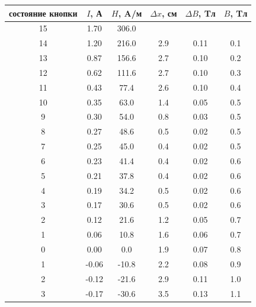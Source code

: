 \documentclass[a4paper,14pt]{article}
\begin{document}
\begin{table}[hbt!]
	\begin{center}
	\begin{tabular}{|c|c|c|c|c|c|}
		\hline
		состояние кнопки & $I$, А     & $H$, A/м        & $\Delta x$, см & $\Delta B$, Tл & $B$, Tл \\ \hline
15               & 1.70   & 306.0   &             &             &       \\ \hline
14               & 1.20   & 216.0   & 2.9         & 0.11        & 0.1   \\ \hline
13               & 0.87   & 156.6   & 2.7         & 0.10        & 0.2   \\ \hline
12               & 0.62   & 111.6   & 2.7         & 0.10        & 0.3   \\ \hline
11               & 0.43   & 77.4    & 2.6         & 0.10        & 0.4   \\ \hline
10               & 0.35   & 63.0    & 1.4         & 0.05        & 0.5   \\ \hline
9                & 0.30   & 54.0    & 0.8         & 0.03        & 0.5   \\ \hline
8                & 0.27   & 48.6    & 0.5         & 0.02        & 0.5   \\ \hline
7                & 0.25   & 45.0    & 0.4         & 0.02        & 0.5   \\ \hline
6                & 0.23   & 41.4    & 0.4         & 0.02        & 0.6   \\ \hline
5                & 0.21   & 37.8    & 0.4         & 0.02        & 0.6   \\ \hline
4                & 0.19   & 34.2    & 0.5         & 0.02        & 0.6   \\ \hline
3                & 0.17   & 30.6    & 0.5         & 0.02        & 0.6   \\ \hline
2                & 0.12   & 21.6    & 1.2         & 0.05        & 0.7   \\ \hline
1                & 0.06   & 10.8    & 1.6         & 0.06        & 0.7   \\ \hline
0                & 0.00   & 0.0     & 1.9         & 0.07        & 0.8   \\ \hline
1                & -0.06  & -10.8   & 2.2         & 0.08        & 0.9   \\ \hline
2                & -0.12  & -21.6   & 2.9         & 0.11        & 1.0   \\ \hline
3                & -0.17  & -30.6   & 3.5         & 0.13        & 1.1   \\ \hline

\end{tabular}
\end{center}
\end{table}
\end{document}
